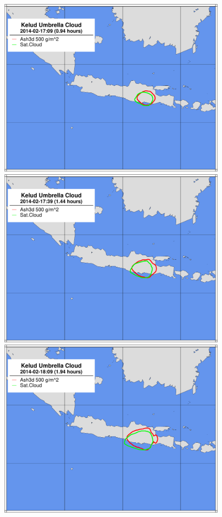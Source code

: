 \begin{figure}[htbp]
\includegraphics[angle=0,scale=0.3]{Figures/TestCase_Results/ValidTest/Kelud_CloudOutline_2.pdf}
\includegraphics[angle=0,scale=0.3]{Figures/TestCase_Results/ValidTest/Kelud_CloudOutline_3.pdf}
\includegraphics[angle=0,scale=0.3]{Figures/TestCase_Results/ValidTest/Kelud_CloudOutline_4.pdf}

\end{figure}
